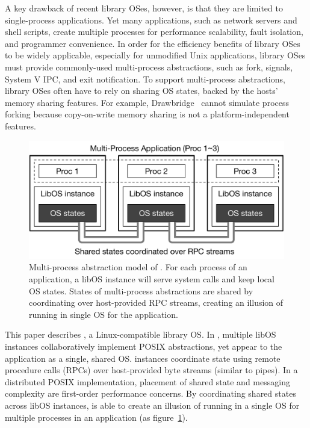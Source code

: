 A key drawback of recent library OSes, however,
is that they are limited to single-process applications.
Yet many applications, such as network servers and
shell scripts,
create multiple processes
for
performance scalability, fault isolation, and programmer convenience.
In order for the efficiency benefits of library OSes to be widely applicable,
especially for unmodified Unix applications,
library OSes must  provide commonly-used multi-process abstractions,
such as fork,  signals, System V IPC, and exit notification.
To support multi-process abstractions, library OSes often have to rely on sharing OS states,
backed by the hosts' memory sharing features.
For example, Drawbridge~\citep{porter11drawbridge} cannot simulate process forking because copy-on-write memory sharing is not a platform-independent features.


\begin{figure}[t!]
\centering
\includegraphics[width=0.75\linewidth]{graphene/figures/concept.pdf}
\caption[Multi-process abstraction model of \sysname{} \libos{}]
{Multi-process abstraction model of \sysname{} \libos{}. For each process of an application, a libOS instance will serve system calls and keep local OS states. States of multi-process abstractions are shared by coordinating over host-provided RPC streams, creating an illusion of running in single OS for the application.}
\label{fig:concept}
\end{figure}

This paper describes {\bf \sysname{}},  a Linux-compatible library OS.
In \sysname{}, multiple libOS instances collaboratively implement
POSIX abstractions,
yet appear to the application
as a single, shared OS.
\sysname{} instances coordinate state using remote procedure calls (RPCs) over
host-provided byte streams (similar to pipes).
In a distributed POSIX implementation, placement of shared state and messaging complexity
are first-order performance concerns.
By coordinating shared states across libOS instances,
\sysname{} is able to create an illusion 
of running in a single OS
for multiple processes in an application (as figure~\ref{fig:concept}).

